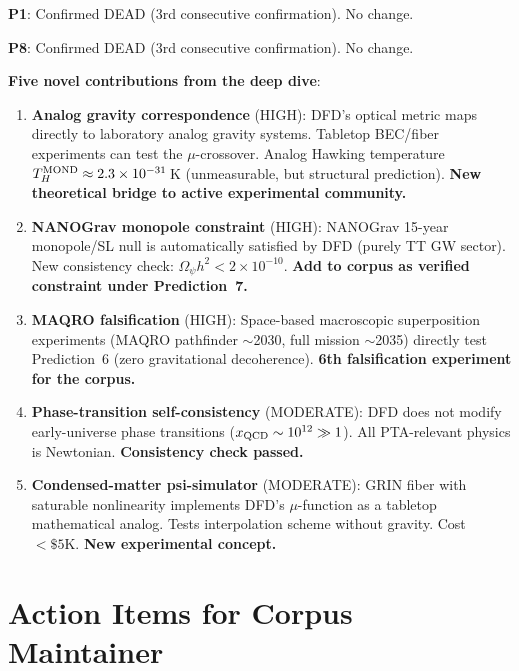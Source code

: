 \documentclass[11pt]{article}
\newcommand{\ee}[1]{\times 10^{#1}}
\begin{document}
\begin{tcolorbox}[colback=green!5!white, colframe=green!60!black,
  title=\textbf{W4i13 Summary}]

\textbf{P1}: Confirmed DEAD (3rd consecutive confirmation). No change.

\textbf{P8}: Confirmed DEAD (3rd consecutive confirmation). No change.

\textbf{Five novel contributions from the deep dive}:

\begin{enumerate}[nosep]
\item \textbf{Analog gravity correspondence} (HIGH): DFD's optical
  metric maps directly to laboratory analog gravity systems. Tabletop
  BEC/fiber experiments can test the $\mu$-crossover. Analog Hawking
  temperature $T_H^{\rm MOND} \approx 2.3\ee{-31}\,$K (unmeasurable,
  but structural prediction). \textbf{New theoretical bridge to active
  experimental community.}

\item \textbf{NANOGrav monopole constraint} (HIGH): NANOGrav 15-year
  monopole/SL null is automatically satisfied by DFD (purely TT GW
  sector). New consistency check: $\Omega_\psi h^2 < 2\ee{-10}$.
  \textbf{Add to corpus as verified constraint under Prediction~7.}

\item \textbf{MAQRO falsification} (HIGH): Space-based macroscopic
  superposition experiments (MAQRO pathfinder $\sim$2030, full mission
  $\sim$2035) directly test Prediction~6 (zero gravitational
  decoherence). \textbf{6th falsification experiment for the corpus.}

\item \textbf{Phase-transition self-consistency} (MODERATE): DFD does
  not modify early-universe phase transitions ($x_{\rm QCD} \sim
  10^{12} \gg 1$). All PTA-relevant physics is Newtonian.
  \textbf{Consistency check passed.}

\item \textbf{Condensed-matter psi-simulator} (MODERATE): GRIN fiber
  with saturable nonlinearity implements DFD's $\mu$-function as a
  tabletop mathematical analog. Tests interpolation scheme without
  gravity. Cost $<\$5\text{K}$. \textbf{New experimental concept.}
\end{enumerate}

\end{tcolorbox}

\section*{Action Items for Corpus Maintainer}
\end{document}
